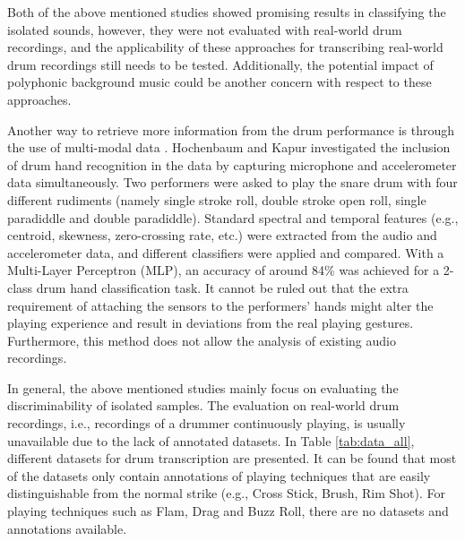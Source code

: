 \documentclass{article}
\begin{document}
Both of the above mentioned studies showed promising results in classifying the isolated sounds, however, they were not evaluated with real-world drum recordings, and the applicability of these approaches for transcribing real-world drum recordings still needs to be tested. Additionally, the potential impact of polyphonic background music could be another concern with respect to these approaches. 
 
Another way to retrieve more information from the drum performance is through the use of multi-modal data \cite{Hochenbaum2011}. Hochenbaum and Kapur investigated the inclusion of drum hand recognition in the data by capturing microphone and accelerometer data simultaneously. Two performers were asked to play the snare drum with four different rudiments (namely single stroke roll, double stroke open roll, single paradiddle and double paradiddle). Standard spectral and temporal features (e.g., centroid, skewness, zero-crossing rate, etc.) were extracted from the audio and accelerometer data, and different classifiers were applied and compared. With a Multi-Layer Perceptron (MLP), an accuracy of around 84\% was achieved for a 2-class drum hand classification task. It cannot be ruled out that the extra requirement of attaching the sensors to the performers' hands might alter the playing experience and result in deviations from the real playing gestures. Furthermore, this method does not allow the analysis of existing audio recordings. 

In general, the above mentioned studies mainly focus on evaluating the discriminability of isolated samples. The evaluation on real-world drum recordings, i.e., recordings of a drummer continuously playing, is usually unavailable due to the lack of annotated datasets. In Table \ref{tab:data_all}, different datasets for drum transcription are presented. It can be found that most of the datasets only contain annotations of playing techniques that are easily distinguishable from the normal strike (e.g., Cross Stick, Brush, Rim Shot). For playing techniques such as Flam, Drag and Buzz Roll, there are no datasets and annotations available. 

\end{document}
